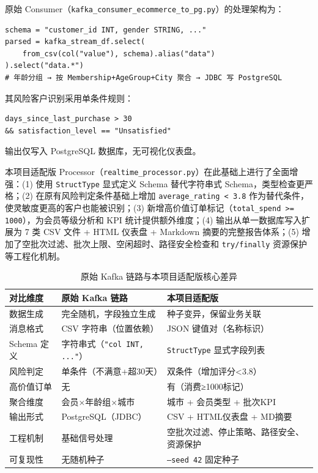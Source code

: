 \documentclass[12pt,hyperref,a4paper,UTF8]{ctexart}
\begin{document}
原始 Consumer（\texttt{kafka\_consumer\_ecommerce\_to\_pg.py}）的处理架构为：

\begin{verbatim}
schema = "customer_id INT, gender STRING, ..."
parsed = kafka_stream_df.select(
    from_csv(col("value"), schema).alias("data")
).select("data.*")
# 年龄分组 → 按 Membership+AgeGroup+City 聚合 → JDBC 写 PostgreSQL
\end{verbatim}

其风险客户识别采用单条件规则：

\begin{verbatim}
days_since_last_purchase > 30
&& satisfaction_level == "Unsatisfied"
\end{verbatim}

输出仅写入 PostgreSQL 数据库，无可视化仪表盘。

本项目适配版 Processor（\texttt{realtime\_processor.py}）在此基础上进行了全面增强：(1) 使用 \texttt{StructType} 显式定义 Schema 替代字符串式 Schema，类型检查更严格；(2) 在原有风险判定条件基础上增加 \texttt{average\_rating < 3.8} 作为替代条件，使灵敏度更高的客户也能被识别；(3) 新增高价值订单标记（\texttt{total\_spend >= 1000}），为会员等级分析和 KPI 统计提供额外维度；(4) 输出从单一数据库写入扩展为 7 类 CSV 文件 + HTML 仪表盘 + Markdown 摘要的完整报告体系；(5) 增加了空批次过滤、批次上限、空闲超时、路径安全检查和 \texttt{try/finally} 资源保护等工程化机制。

\begin{table}[H]
\centering
\caption{原始 Kafka 链路与本项目适配版核心差异}
\begin{tabular}{p{2.8cm}p{4.2cm}p{4.5cm}}
\toprule
对比维度 & 原始 Kafka 链路 & 本项目适配版 \\
\midrule
数据生成 & 完全随机，字段独立生成 & 种子变异，保留业务关联 \\
消息格式 & CSV 字符串（位置依赖） & JSON 键值对（名称标识） \\
Schema 定义 & 字符串式（\texttt{"col INT, ..."}） & \texttt{StructType} 显式字段列表 \\
风险判定 & 单条件（不满意+超30天） & 双条件（增加评分<3.8） \\
高价值订单 & 无 & 有（消费≥1000标记） \\
聚合维度 & 会员×年龄组×城市 & 城市 + 会员类型 + 批次KPI \\
输出形式 & PostgreSQL（JDBC） & CSV + HTML仪表盘 + MD摘要 \\
工程机制 & 基础信号处理 & 空批次过滤、停止策略、路径安全、资源保护 \\
可复现性 & 无随机种子 & \texttt{--seed 42} 固定种子 \\
\bottomrule
\end{tabular}
\end{table}
\end{document}
